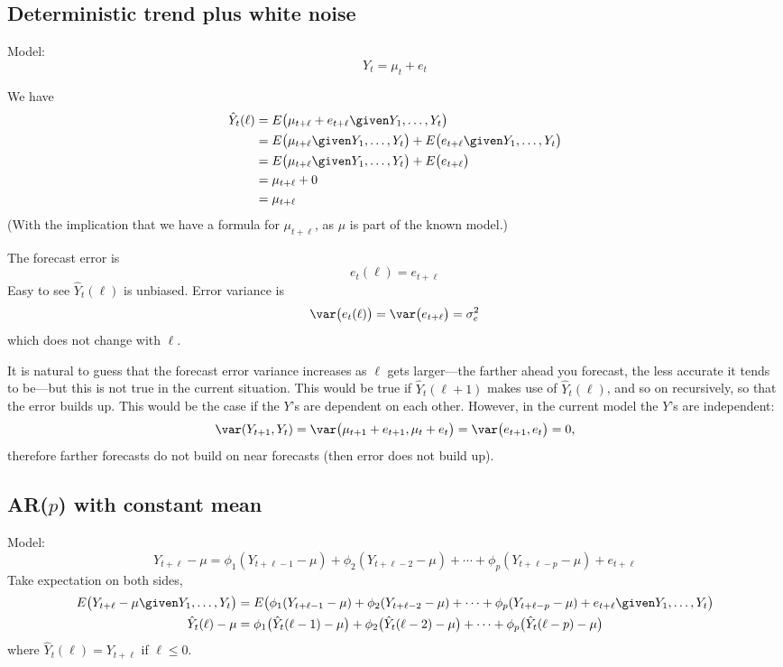 \documentclass[12pt]{article}
\begin{document}
\subsection{Deterministic trend plus white noise}

Model:
\[
Y_t = \mu_t + e_t
\]

We have
\[
\begin{split}
\hat{Y}_t(\ell)
&= E\bigl(\mu_{t+\ell} + e_{t+\ell} \given Y_1,\dotsc,Y_t\bigr)
\\
&= E\bigl(\mu_{t+\ell} \given Y_1,\dotsc,Y_t\bigr)
    + E\bigl(e_{t+\ell} \given Y_1,\dotsc,Y_t\bigr)
\\
&= E\bigl(\mu_{t+\ell} \given Y_1,\dotsc,Y_t\bigr)
    + E\bigl(e_{t+\ell}\bigr)
\\
&= \mu_{t+\ell} + 0
\\
&= \mu_{t+\ell}
\end{split}
\]
(With the implication that we have a formula for $\mu_{t+\ell}$,
as $\mu$ is part of the known model.)

The forecast error is
\[
e_t(\ell) = e_{t+\ell}
\]
Easy to see $\hat{Y}_t(\ell)$ is unbiased.
Error variance is
\[
\var\bigl(e_t(\ell)\bigr)
= \var\bigl(e_{t+\ell}\bigr)
= \sigma^2_e
\]
which does not change with $\ell$.

It is natural to guess that the forecast error variance increases as
$\ell$ gets larger---the farther ahead you forecast, the less accurate it
tends to be---but this is not true in the current situation.
This would be true if $\hat{Y}_t(\ell+1)$ makes use of $\hat{Y}_t(\ell)$,
and so on recursively, so that the error builds up.
This would be the case if the $Y$'s are dependent on each other.
However, in the current model the $Y$'s are independent:
\[
\var(Y_{t+1}, Y_t)
= \var\bigl(\mu_{t+1} + e_{t+1}, \mu_t + e_t\bigr)
= \var\bigl(e_{t+1}, e_t\bigr)
= 0
,
\]
therefore farther forecasts do not build on near forecasts
(then error does not build up).

\subsection{AR($p$) with constant mean}

Model:
\begin{equation}\label{eq:AR-forecast-model}
Y_{t+\ell} - \mu
= \phi_1 (Y_{t+\ell-1} - \mu)
    + \phi_2 (Y_{t+\ell-2} - \mu)
    + \dotsb
    + \phi_p (Y_{t+\ell-p} - \mu)
    + e_{t+\ell}
\end{equation}
Take expectation on both sides,
\begin{equation}\label{eq:AR-Ytlhat-recursive}
\begin{split}
E\bigl(Y_{t+\ell} - \mu \given Y_1,\dotsc,Y_t\bigr)
&= E\bigl(\phi_1 (Y_{t+\ell-1} - \mu)
    + \phi_2 (Y_{t+\ell-2} - \mu)
    + \dotsb
    + \phi_p (Y_{t+\ell-p} - \mu)
    + e_{t+\ell} \given Y_1,\dotsc,Y_t\bigr)
\\
\hat{Y}_t(\ell) - \mu
&= \phi_1\bigl(\hat{Y}_t(\ell-1) - \mu\bigr)
    + \phi_2\bigl(\hat{Y}_t(\ell-2) - \mu\bigr)
    + \dotsb
    + \phi_p\bigl(\hat{Y}_t(\ell-p) - \mu\bigr)
\end{split}
\end{equation}
where $\hat{Y}_t(\ell) = Y_{t+\ell}$ if $\ell \le 0$.
\end{document}
